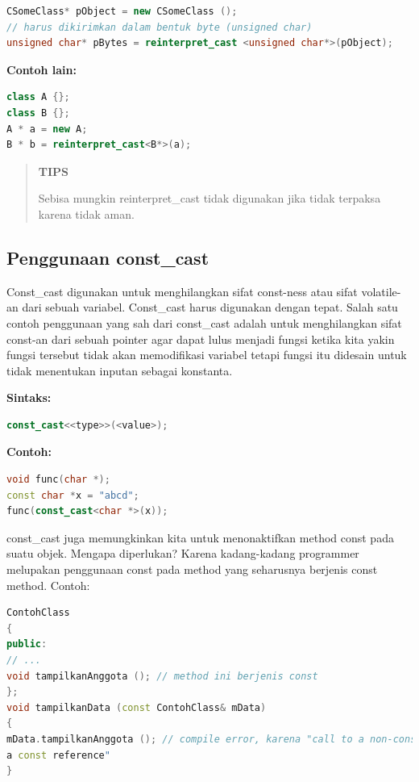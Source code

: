\begin{lstlisting}[language=c++, numbers=none]
CSomeClass* pObject = new CSomeClass ();
// harus dikirimkan dalam bentuk byte (unsigned char)
unsigned char* pBytes = reinterpret_cast <unsigned char*>(pObject);
\end{lstlisting}

\textbf{Contoh lain:}

\begin{lstlisting}[language=c++, numbers=none]
class A {};
class B {};
A * a = new A;
B * b = reinterpret_cast<B*>(a);
\end{lstlisting}

\begin{quotation}
\textbf{TIPS} 

Sebisa
mungkin reinterpret\_cast tidak digunakan jika tidak terpaksa karena
tidak aman.
\end{quotation}


\subsection{Penggunaan const\_cast}\label{penggunaan-constux5fcast}

Const\_cast digunakan untuk menghilangkan sifat const-ness atau sifat
volatile-an dari sebuah variabel. Const\_cast harus digunakan dengan
tepat. Salah satu contoh penggunaan yang sah dari const\_cast adalah
untuk menghilangkan sifat const-an dari sebuah pointer agar dapat lulus
menjadi fungsi ketika kita yakin fungsi tersebut tidak akan memodifikasi
variabel tetapi fungsi itu didesain untuk tidak menentukan inputan
sebagai konstanta.

\textbf{Sintaks:}

\begin{lstlisting}[language=c++, numbers=none]
const_cast<<type>>(<value>);
\end{lstlisting}

\textbf{Contoh:}

\begin{lstlisting}[language=c++, numbers=none]
void func(char *);
const char *x = "abcd";
func(const_cast<char *>(x));
\end{lstlisting}

const\_cast juga memungkinkan kita untuk menonaktifkan method const pada
suatu objek. Mengapa diperlukan? Karena kadang-kadang programmer
melupakan penggunaan const pada method yang seharusnya berjenis const
method. Contoh:

\begin{lstlisting}[language=c++, numbers=none]
ContohClass
{
public:
// ...
void tampilkanAnggota (); // method ini berjenis const
};
void tampilkanData (const ContohClass& mData)
{
mData.tampilkanAnggota (); // compile error, karena "call to a non-const member using
a const reference"
}
\end{lstlisting}

